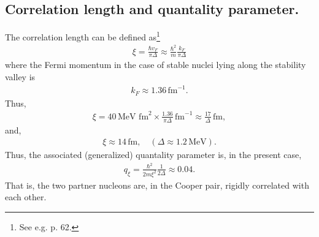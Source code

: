 \begin{subappendices}
\section{Correlation length and quantality parameter.}\label{App6H}
The correlation length can be defined as\footnote{See e.g. \cite{Annett:13} p. 62.}
\begin{align}\label{eqApp6H1}
\xi=\frac{\hbar v_F}{\pi\Delta}\approx\frac{\hbar^2}{m}\frac{k_F}{\pi\Delta}
\end{align}
where the Fermi momentum in the case of stable nuclei lying along the stability valley is
\begin{align}\label{eqApp6H2}
k_F\approx 1.36\,\text{fm}^{-1}.
\end{align}
Thus,
\begin{align}\label{eqApp6H3} 	
\xi=40\,\text{MeV fm}^2\times \frac{1.36}{\pi\Delta}\,\text{fm}^{-1}\approx \frac{17}{\Delta}\,\text{fm},
\end{align}
and,
\begin{align}\label{eqApp6H4}
\xi\approx 14\,\text{fm},\quad (\Delta\approx1.2\,\text{MeV}).
\end{align}
Thus, the associated (generalized) quantality parameter is, in the present case,
\begin{align}\label{eqApp6H8}
q_\xi=\frac{\hbar^2}{2m\xi^2}\frac{1}{2\Delta}\approx0.04.
\end{align} 
That is, the two partner nucleons are, in the Cooper pair, rigidly correlated with each other.




\end{subappendices}
